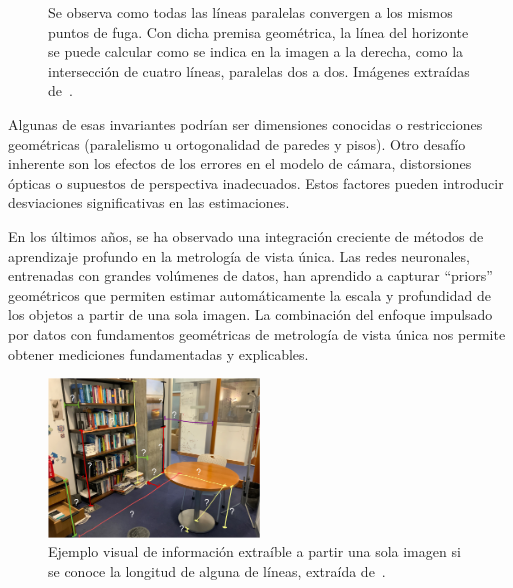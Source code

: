 \begin{figure}[htp]
\begin{center}
\end{center}
\caption{Se observa como todas las líneas paralelas convergen a los mismos puntos de fuga.
Con dicha premisa geométrica, 
la línea del horizonte se puede calcular como se indica en la imagen a la derecha, como la intersección de cuatro líneas, paralelas dos a dos.
Imágenes extraídas de~\cite{VisionBookMIT}.
}
\label{fig:PalmaHorizon}
\end{figure}

Algunas de esas invariantes podrían ser dimensiones conocidas o restricciones geométricas (paralelismo u ortogonalidad de paredes y pisos).
Otro desafío inherente son los efectos de los errores en el modelo de cámara, distorsiones ópticas o supuestos de perspectiva inadecuados.
Estos factores pueden introducir desviaciones significativas en las estimaciones.
\par 
En los últimos años, se ha observado una integración creciente de métodos de aprendizaje profundo en la metrología de vista única. 
Las redes neuronales, entrenadas con grandes volúmenes de datos, han aprendido a capturar ``priors'' geométricos que permiten 
estimar automáticamente la escala y profundidad de los objetos a partir de una sola imagen. La combinación del enfoque 
impulsado por datos con fundamentos geométricas de metrología de vista única nos permite obtener mediciones fundamentadas y explicables.

\begin{figure}[htp]
\begin{center}
    \includegraphics[width=0.5\textwidth]{imagenes/chapter2/office-measurements}
\end{center}
\caption{Ejemplo visual de información extraíble a partir una sola imagen si se conoce la longitud de alguna de líneas, extraída de~\cite{VisionBookMIT}.
}
\label{fig:OfficeMeasurements}
\end{figure}

